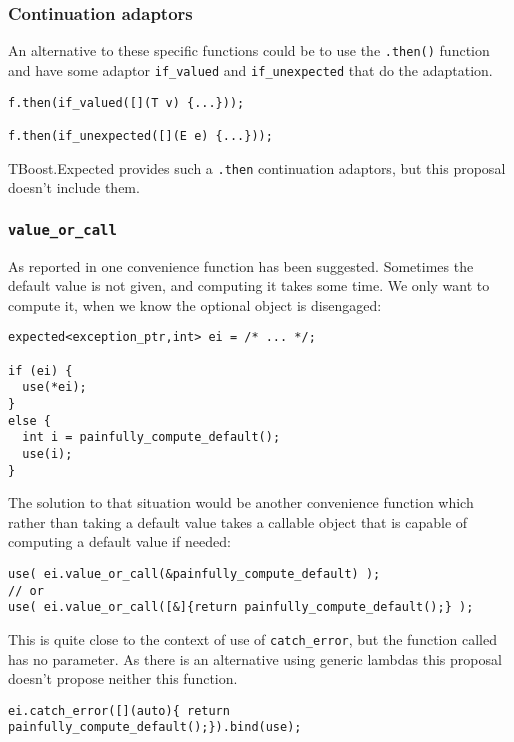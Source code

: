 \documentclass[a4paper,10pt]{article}
\newcommand{\cpp}[1]{\lstinline{#1}}
\begin{document}
\subsubsection{Continuation adaptors}

An alternative to these specific functions could be to use the \cpp{.then()} function and have some adaptor \cpp{if_valued} and \cpp{if_unexpected} that do the adaptation.

\begin{lstlisting}
f.then(if_valued([](T v) {...}));

f.then(if_unexpected([](E e) {...}));
\end{lstlisting}

TBoost.Expected \cite{boost_expected} provides such a \cpp{.then} continuation adaptors, but this proposal doesn't include them.

\subsubsection{\cpp{value_or_call}}

As reported in \cite{OPTIONAL_R5} one  convenience function has been suggested. Sometimes the default value is not given, and computing it takes some time. We only want to compute it, when we know the optional object is disengaged:

\begin{lstlisting}
expected<exception_ptr,int> ei = /* ... */;

if (ei) {
  use(*ei);
}
else {
  int i = painfully_compute_default();
  use(i);
}
\end{lstlisting}

The solution to that situation would be another convenience function which rather than taking a default value takes a callable object that is capable of computing a default value if needed:

\begin{lstlisting}
use( ei.value_or_call(&painfully_compute_default) );       
// or
use( ei.value_or_call([&]{return painfully_compute_default();} );
\end{lstlisting}

This is quite close to the context of use of  \cpp{catch_error}, but the function called has no parameter. As there is an alternative using generic lambdas this proposal doesn't propose neither this function.

\begin{lstlisting}
ei.catch_error([](auto){ return painfully_compute_default();}).bind(use);       
\end{lstlisting}
\end{document}
